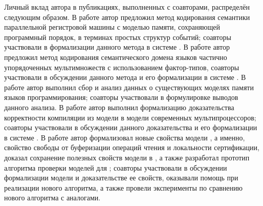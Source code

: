 
Личный вклад автора в публикациях, выполненных с соавторами, распределён следующим образом.
В работе \cite{Gladstein-al:ISPRAS21} автор предложил
метод кодирования семантики параллельной регистровой машины с
моделью памяти, сохраняющей программный порядок, в терминах простых структур событий;
соавторы участвовали в формализации данного метода в системе \coq.
В работе \cite{Moiseenko-al:STJITMO22} автор предложил
метод кодирования семантического домена языков частично упорядоченных мультимножеств
с использованием фактор-типов, 
соавторы участвовали в обсуждении данного метода и его формализации в системе \coq.
В работе \cite{Moiseenko-al:PCS21} автор выполнил сбор и анализ данных
о существующих моделях памяти языков программирования;
соавторы участвовали в формулировке выводов данного анализа.
В работе \cite{Moiseenko-al:ECOOP20} автор выполнил
формализацию доказательства корректности компиляции из
модели \Wkm в модели современных мультипроцессоров;
соавторы участвовали в обсуждении данного доказательства
и его формализации в системе \coq.
В работе \cite{Moiseenko-al:OOPSLA22} автор
формализовал новые свойства модели \WkmS,
а именно, свойство свободы от буферизации операций чтения и локальности сертификации,
доказал сохранение полезных свойств модели \Wkm в \WkmS,
а также разработал прототип алгоритма проверки моделей для \WkmS;
соавторы участвовали в обсуждении формализации модели \WkmS
и доказательстве ее свойств,
оказывали помощь при реализации нового алгоритма,
а также провели эксперименты по сравнению нового алгоритма с аналогами.
